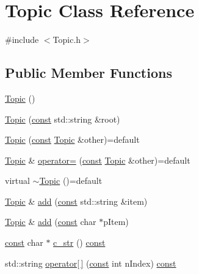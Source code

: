 \hypertarget{class_topic}{}\section{Topic Class Reference}
\label{class_topic}


{\ttfamily \#include $<$Topic.\+h$>$}

\subsection*{Public Member Functions}
\begin{DoxyCompactItemize}
\item 
\hyperlink{class_topic_af3301cb0d535eb066a3ea4ed54e28414}{Topic} ()
\item 
\hyperlink{class_topic_a4e2b337c972d1766c80b48e4981eb47f}{Topic} (\hyperlink{functions__c_8js_afacfd9c985d225bb07483b887a801b6f}{const} std\+::string \&root)
\item 
\hyperlink{class_topic_a5650ccda9f2d99bfd54e90e1f92bc7b2}{Topic} (\hyperlink{functions__c_8js_afacfd9c985d225bb07483b887a801b6f}{const} \hyperlink{class_topic}{Topic} \&other)=default
\item 
\hyperlink{class_topic}{Topic} \& \hyperlink{class_topic_a744c65ee1c771c392945fe1eba061b7d}{operator=} (\hyperlink{functions__c_8js_afacfd9c985d225bb07483b887a801b6f}{const} \hyperlink{class_topic}{Topic} \&other)=default
\item 
virtual \hyperlink{class_topic_ad87e9349bbd468750670205498a5417a}{$\sim$\+Topic} ()=default
\item 
\hyperlink{class_topic}{Topic} \& \hyperlink{class_topic_abce06cc663933929b9636f9c3f1e3a39}{add} (\hyperlink{functions__c_8js_afacfd9c985d225bb07483b887a801b6f}{const} std\+::string \&item)
\item 
\hyperlink{class_topic}{Topic} \& \hyperlink{class_topic_a340aa8d9fa92ad882f72f3fdb333a62a}{add} (\hyperlink{functions__c_8js_afacfd9c985d225bb07483b887a801b6f}{const} char $\ast$p\+Item)
\item 
\hyperlink{functions__c_8js_afacfd9c985d225bb07483b887a801b6f}{const} char $\ast$ \hyperlink{class_topic_a8f11bba4553f3294cc6c88b5608965a8}{c\+\_\+str} () \hyperlink{functions__c_8js_afacfd9c985d225bb07483b887a801b6f}{const} 
\item 
std\+::string \hyperlink{class_topic_a86750eb909dff0a6970dd05ee7e9b8e0}{operator\mbox{[}$\,$\mbox{]}} (\hyperlink{functions__c_8js_afacfd9c985d225bb07483b887a801b6f}{const} int n\+Index) \hyperlink{functions__c_8js_afacfd9c985d225bb07483b887a801b6f}{const} 
\end{DoxyCompactItemize}


